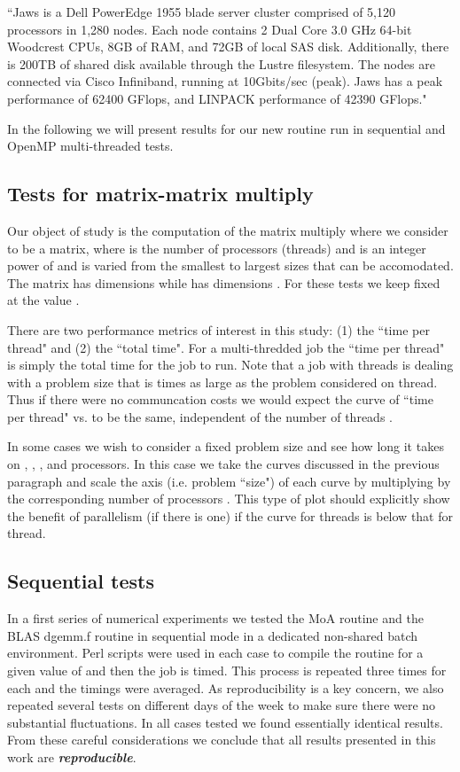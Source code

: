 \documentclass[aps,prl,twocolumn,groupedaddress,floatfix]{revtex4}
\begin{document}
``Jaws is a Dell PowerEdge 1955 blade server cluster comprised of 5,120 
processors in 1,280 nodes. Each node contains 2 Dual Core 3.0 GHz 64-bit 
Woodcrest CPUs, 8GB of RAM, and 72GB of local SAS disk.  Additionally, 
there is 200TB of shared disk available through the Lustre filesystem. The 
nodes are connected via Cisco Infiniband, running at 10Gbits/sec (peak).
Jaws has a peak performance of 62400 GFlops, and LINPACK performance of 
42390 GFlops."

In the following we will present results for our new routine run in 
sequential and OpenMP multi-threaded tests.

\subsection{Tests for matrix-matrix multiply}

Our object of study is the computation of the matrix multiply
 where we consider  to be a  matrix, where 
 is the number of processors (threads) and  is an integer power of 
 and is varied from the smallest to largest sizes that can be accomodated.
The matrix  has dimensions  while  has dimensions
.  For these tests we keep  fixed at the value
.

There are two performance metrics of interest in this study: (1) the 
``time per thread" and (2) the ``total time".  For a multi-thredded job
the ``time per thread" is simply the total time for the job to run.  Note
that a job with  threads is dealing with a problem size that is 
times as large as the problem considered on  thread.  Thus if there were
no communcation costs we would expect the curve of ``time per thread" vs.
 to be the same, independent of the number of threads .

In some cases we wish to consider a fixed problem size and see how long it
takes on , , , and  processors.  In this case we take the 
curves discussed in the previous paragraph and scale the  axis 
(i.e. problem ``size") of each curve by multiplying by the corresponding 
number of processors .  This type of plot should explicitly show the 
benefit of parallelism (if there is one) if the curve for  threads
is below that for  thread.

\subsection{Sequential tests}

In a first series of numerical experiments we tested the MoA routine and 
the BLAS dgemm.f routine in sequential mode in a dedicated non-shared 
batch environment.  Perl scripts were used in each case to compile the
routine for a given value of  and then the job is timed.  This process
is repeated three times for each  and the timings were averaged.  As 
reproducibility is a key concern, we also repeated several tests on 
different days of the week to make sure there were no substantial 
fluctuations.  In all cases
tested we found essentially identical results.  From these careful 
considerations we conclude that all results presented in this work are
{\bf \em reproducible}.
\end{document}
